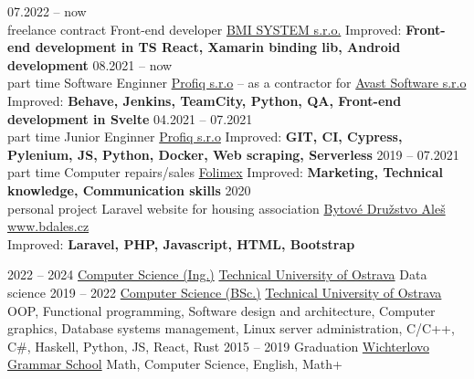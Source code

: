 \documentclass[9pt]{developercv} %
\begin{document}
\begin{entrylist}
    \entry
		{07.2022 -- now\\\footnotesize{freelance contract}}
		{Front-end developer}
		{\href{http://www.bmisystem.cz/}{BMI SYSTEM s.r.o.}}
		{Improved: \textbf{Front-end development in TS React, Xamarin binding lib, Android development}}
	\entry
		{08.2021 -- now\\\footnotesize{part time}}
		{Software Enginner}
		{\href{https://www.profiq.com/}{Profiq s.r.o} -- as a contractor for \href{https://www.avast.com/index}{Avast Software s.r.o}}
		{Improved: \textbf{Behave, Jenkins, TeamCity, Python, QA, Front-end development in Svelte}}
	\entry
		{04.2021 -- 07.2021\\\footnotesize{part time}}
		{Junior Enginner}
		{\href{https://www.profiq.com/}{Profiq s.r.o}}
		{Improved: \textbf{GIT, CI, Cypress, Pylenium, JS, Python, Docker, Web scraping, Serverless}}
	\entry
		{2019 -- 07.2021\\\footnotesize{part time}}
		{Computer repairs/sales}
		{\href{https://www.folimex.cz/}{Folimex}}
		{Improved: \textbf{Marketing, Technical knowledge, Communication skills}}
	\entry
		{2020\\\footnotesize{personal project}}
		{Laravel website for housing association}
		{\href{www.bdales.cz}{Bytové Družstvo Aleš}}
		{\href{www.bdales.cz}{www.bdales.cz}\\Improved: \textbf{Laravel, PHP, Javascript, HTML, Bootstrap}}
\end{entrylist}


\begin{entrylist}
	\entry
		{2022 -- 2024}
		{\href{https://www.vsb.cz/en/ects/fei/?programmeId=1103&academicYearId=62}{Computer Science (Ing.)}}
		{\href{https://www.fei.vsb.cz/en/}{Technical University of Ostrava}}
		{Data science}
	\entry
		{2019 -- 2022}
		{\href{https://www.vsb.cz/en/ects/fei/?programmeId=771&academicYearId=62}{Computer Science (BSc.)}}
		{\href{https://www.fei.vsb.cz/en/}{Technical University of Ostrava}}
		{OOP, Functional programming, Software design and architecture, Computer graphics, Database systems management, Linux server administration, C/C++, C\#, Haskell, Python, JS, React, Rust}
	\entry
		{2015 -- 2019}
		{Graduation}
		{\href{www.wigym.cz/}{Wichterlovo Grammar School}}
		{Math, Computer Science, English, Math+}
\end{entrylist}
\end{document}
